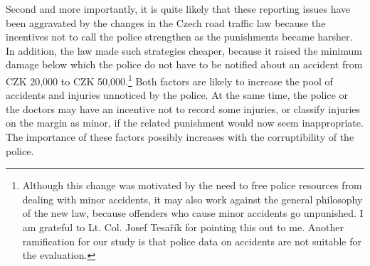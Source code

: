 \documentclass[12pt]{article}
\begin{document}
\begin{table}[t] 
  \scriptsize  
\end{table} 

Second and more importantly, it is quite likely that these reporting issues have
been aggravated by the changes in the Czech road traffic law because the
incentives not to call the police strengthen as the punishments became harsher.
In addition, the law made such strategies cheaper, because it raised the minimum
damage below which the police do not have to be notified about an accident
from CZK 20,000 to CZK 50,000.\footnote{Although this change was motivated by
  the need to free police resources from dealing with minor accidents, it may
  also work against the general philosophy of the new law, because offenders who
  cause minor accidents go unpunished. I am grateful to Lt.  Col. Josef
  Tesa\v{r}\'{i}k for pointing this out to me. Another ramification for our
  study is that police data on accidents are not suitable for the evaluation.}
Both factors are likely to increase the pool of accidents and injuries unnoticed
by the police. At the same time, the police or the doctors may have an incentive
not to record some injuries, or classify injuries on the margin as minor,
if the related punishment would now seem inappropriate. The importance of these
factors possibly increases with the corruptibility of the police.
\end{document}
